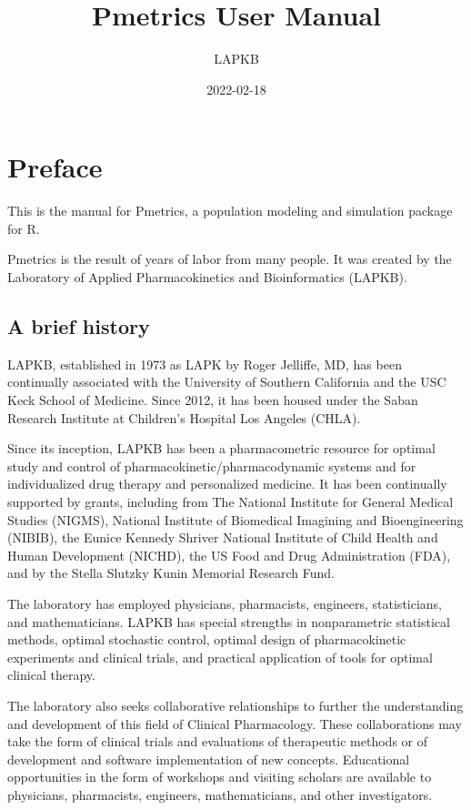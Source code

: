 \documentclass[
]{book}
\title{Pmetrics User Manual}
\author{LAPKB}
\date{2022-02-18}
\begin{document}
\maketitle

{
\setcounter{tocdepth}{1}
\tableofcontents
}
\hypertarget{preface}{%
\chapter{Preface}\label{preface}}

This is the manual for Pmetrics, a population modeling and simulation package for R.

Pmetrics is the result of years of labor from many people. It was created by the Laboratory of Applied Pharmacokinetics and Bioinformatics (LAPKB).

\hypertarget{a-brief-history}{%
\section{A brief history}\label{a-brief-history}}

LAPKB, established in 1973 as LAPK by Roger Jelliffe, MD, has been continually associated with the University of Southern California and the USC Keck School of Medicine. Since 2012, it has been housed under the Saban Research Institute at Children's Hospital Los Angeles (CHLA).

Since its inception, LAPKB has been a pharmacometric resource for optimal study and control of pharmacokinetic/pharmacodynamic systems and for individualized drug therapy and personalized medicine. It has been continually supported by grants, including from The National Institute for General Medical Studies (NIGMS), National Institute of Biomedical Imagining and Bioengineering (NIBIB), the Eunice Kennedy Shriver National Institute of Child Health and Human Development (NICHD), the US Food and Drug Administration (FDA), and by the Stella Slutzky Kunin Memorial Research Fund.

The laboratory has employed physicians, pharmacists, engineers, statisticians, and mathematicians. LAPKB has special strengths in nonparametric statistical methods, optimal stochastic control, optimal design of pharmacokinetic experiments and clinical trials, and practical application of tools for optimal clinical therapy.

The laboratory also seeks collaborative relationships to further the understanding and development of this field of Clinical Pharmacology. These collaborations may take the form of clinical trials and evaluations of therapeutic methods or of development and software implementation of new concepts. Educational opportunities in the form of workshops and visiting scholars are available to physicians, pharmacists, engineers, mathematicians, and other investigators.
\end{document}
